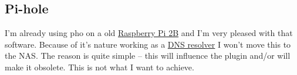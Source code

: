 

\subsection{Pi-hole}\label{subsec:Pi-hole}

I'm already using \gls{pho} on a old \href{https://www.raspberrypi.com/products/raspberry-pi-2-model-b/}{Raspberry Pi 2B}
and I'm very pleased with that software. Because of it's nature working as a
\href{https://en.wikipedia.org/wiki/Domain_Name_System#DNS_resolvers}{DNS resolver}
I won't move this to the NAS. The reason is quite simple -- this will influence
the  plugin and/or will make it obsolete. This is
not what I want to achieve.
